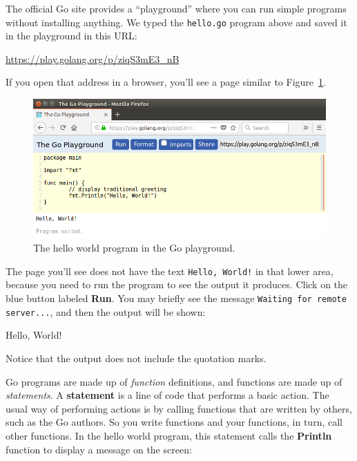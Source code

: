 The official Go site provides a ``playground'' where you can run simple programs without installing anything.
We typed the {\tt hello.go} program above and saved it in the playground in this URL:

\url{https://play.golang.org/p/ziqS3mE3_nB}

If you open that address in a browser, you'll see a page similar to Figure~\ref{fig.playhello}.

\begin{figure}[!ht]
\begin{center}
\includegraphics{figs/play-hello.png}
\caption{The hello world program in the Go playground.}
\label{fig.playhello}
\end{center}
\end{figure}

The page you'll see does not have the text {\tt Hello, World!} in that lower area,
because you need to run the program to see the output it produces.
Click on the blue button labeled {\bf Run}. You may briefly see the message {\tt Waiting for remote server...},
and then the output will be shown:

\begin{stdout}
Hello, World!
\end{stdout}

Notice that the output does not include the quotation marks.



Go programs are made up of {\em function} definitions, and functions are made up of {\em statements}.
A {\bf statement} is a line of code that performs a basic action.
The usual way of performing actions is by calling functions that are written by others, such as the Go authors.
So you write functions and your functions, in turn, call other functions.
In the hello world program, this statement calls the {\bf Println} function to display a message on the screen:

